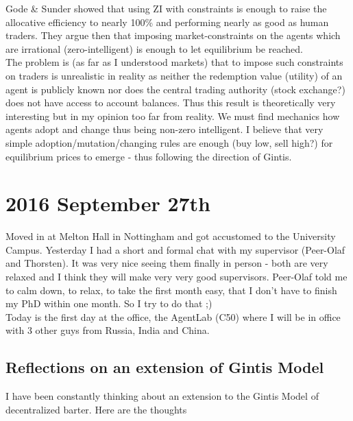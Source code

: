 Gode \& Sunder showed that using ZI with constraints is enough to raise the allocative efficiency to nearly 100\% and performing nearly as good as human traders. They argue then that imposing market-constraints on the agents which are irrational (zero-intelligent) is enough to let equilibrium be reached. \\
The problem is (as far as I understood markets) that to impose such constraints on traders is unrealistic in reality as neither the redemption value (utility) of an agent is publicly known nor does the central trading authority (stock exchange?) does not have access to account balances. Thus this result is theoretically very interesting but in my opinion too far from reality. We must find mechanics how agents adopt and change thus being non-zero intelligent. I believe that very simple adoption/mutation/changing rules are enough (buy low, sell high?) for equilibrium prices to emerge - thus following the direction of Gintis.

\section*{2016 September 27th}
Moved in at Melton Hall in Nottingham and got accustomed to the University Campus. Yesterday I had a short and formal chat with my supervisor (Peer-Olaf and Thorsten). It was very nice seeing them finally in person - both are very relaxed and I think they will make very very good supervisors. Peer-Olaf told me to calm down, to relax, to take the first month easy, that I don't have to finish my PhD within one month. So I try to do that ;) \\ Today is the first day at the office, the AgentLab (C50) where I will be in office with 3 other guys from Russia, India and China. \\

\subsection*{Reflections on an extension of Gintis Model}
I have been constantly thinking about an extension to the Gintis Model of decentralized barter. Here are the thoughts 

